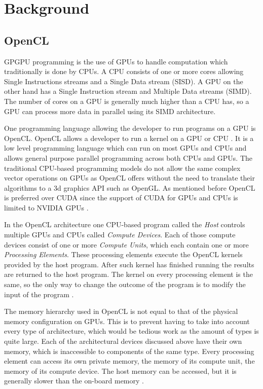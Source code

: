 \section{Background}

\subsection{OpenCL}
GPGPU programming is the use of GPUs to handle computation which traditionally is done by CPUs.
A CPU consists of one or more cores allowing Single Instructions streams and a Single Data stream (SISD).
A GPU on the other hand has a Single Instruction stream and Multiple Data streams (SIMD).
The number of cores on a GPU is generally much higher than a CPU has, so a GPU can process more data in parallel using its SIMD architecture.

One programming language allowing the developer to run programs on a GPU is OpenCL.
OpenCL allows a developer to run a kernel on a GPU or CPU \cite{OpenCL}.
It is a low level programming language which can run on most GPUs and CPUs and allows general purpose parallel programming across both CPUs and GPUs.
The traditional CPU-based programming models do not allow the same complex vector operations on GPUs as OpenCL offers without the need to translate their algorithms to a 3d graphics API such as OpenGL.
As mentioned before OpenCL is preferred over CUDA since the support of CUDA for GPUs and CPUs is limited to NVIDIA GPUs \cite{CUDA}.

In the OpenCL architecture one CPU-based program call\-ed the \textit{Host} controls multiple GPUs and CPUs called \textit{Compute Devices}.
Each of those compute devices consist of one or more \textit{Compute Units}, which each contain one or more \textit{Processing Elements}.
These processing elements execute the OpenCL kernels provided by the host program.
After such kernel has finished running the results are returned to the host program.
The kernel on every processing element is the same, so the only way to change the outcome of the program is to modify the input of the program \cite{OpenCL}.

The memory hierarchy used in OpenCL is not equal to that of the physical memory configuration on GPUs.
This is to prevent having to take into account every type of architecture, which would be tedious work as the amount of types is quite large.
Each of the architectural devices discussed above have their own memory, which is inaccessible to components of the same type.
Every processing element can access its own private memory, the memory of its compute unit, the memory of its compute device.
The host memory can be accessed, but it is generally slower than the on-board memory \cite{OpenCL}.

